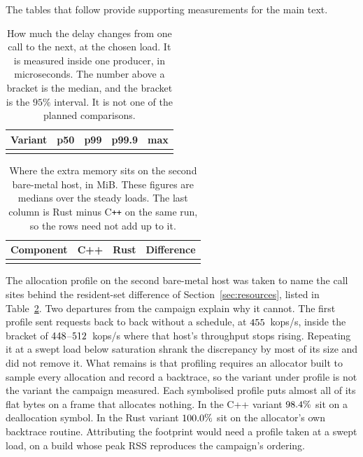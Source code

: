 \documentclass[english,oneside,a4paper,censored,csm,software-track-2020]{HYthesisML}
\begin{document}
\begin{appendices}
The tables that follow provide supporting measurements for the main text.

\begin{table}[ht]
\centering
\small
\caption[How much the delay changes from one call to the next]{How much the delay changes from one call to the next, at the chosen load. It is measured inside one producer, in microseconds. The number above a bracket is the median, and the bracket is the $95\%$ interval. It is not one of the planned comparisons.\label{tab:jitter}}
\begin{tabular}{@{}l r r r r@{}}
\hline\hline
Variant & p50 & p99 & p99.9 & max \\
\hline
\\
\hline
\end{tabular}
\end{table}

\begin{table}[ht]
\centering
\small
\caption[Where the extra memory sits]{Where the extra memory sits on the second bare-metal host, in MiB. These figures are medians over the steady loads. The last column is Rust minus C\texttt{++} on the same run, so the rows need not add up to it.\label{tab:resident}}
\begin{tabular}{@{}l r r r@{}}
\hline\hline
Component & C++ & Rust & Difference \\
\hline
\\
\hline
\end{tabular}
\end{table}

The allocation profile on the second bare-metal host was taken to name the call sites behind
the resident-set difference of Section~\ref{sec:resources}, listed in Table~\ref{tab:resident}. Two departures from the campaign
explain why it cannot. The first profile sent requests back to back without a schedule, at
$455$~kops/s, inside the bracket of $448$--$512$~kops/s where that
host's throughput stops rising. Repeating it at a swept load below saturation
shrank the discrepancy by most of its size and did not remove it. What remains is that
profiling requires an allocator built to sample every allocation and record a backtrace, so the
variant under profile is not the variant the campaign measured. Each symbolised profile puts
almost all of its flat bytes on a frame that allocates nothing. In the C++ variant
$98.4\%$ sit on a deallocation symbol. In the Rust variant
$100.0\%$ sit on the allocator's own backtrace routine. Attributing the footprint
would need a profile taken at a swept load, on a build whose peak RSS reproduces the campaign's
ordering.


\end{appendices}
\end{document}
